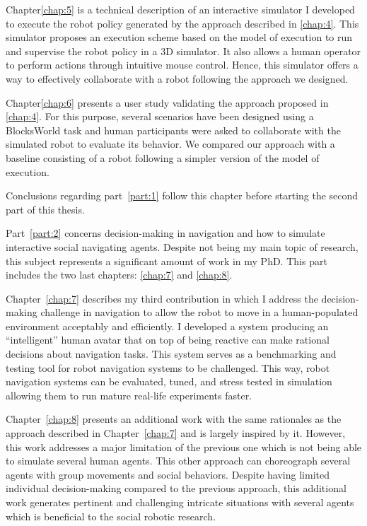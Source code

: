 Chapter\ref{chap:5} is a technical description of an interactive simulator I developed to execute the robot policy generated by the approach described in \ref{chap:4}. This simulator proposes an execution scheme based on the model of execution to run and supervise the robot policy in a 3D simulator. It also allows a human operator to perform actions through intuitive mouse control. Hence, this simulator offers a way to effectively collaborate with a robot following the approach we designed.    

Chapter\ref{chap:6} presents a user study validating the approach proposed in \ref{chap:4}. For this purpose, several scenarios have been designed using a BlocksWorld task and human participants were asked to collaborate with the simulated robot to evaluate its behavior. We compared our approach with a baseline consisting of a robot following a simpler version of the model of execution. 

Conclusions regarding part~\ref{part:1} follow this chapter before starting the second part of this thesis. 

Part~\ref{part:2} concerns decision-making in navigation and how to simulate interactive social navigating agents. Despite not being my main topic of research, this subject represents a significant amount of work in my PhD. This part includes the two last chapters: \ref{chap:7} and \ref{chap:8}.

Chapter~\ref{chap:7} describes my third contribution in which I address the decision-making challenge in navigation to allow the robot to move in a human-populated environment acceptably and efficiently. I developed a system producing an ``intelligent'' human avatar that on top of being reactive can make rational decisions about navigation tasks. This system serves as a benchmarking and testing tool for robot navigation systems to be challenged. This way, robot navigation systems can be evaluated, tuned, and stress tested in simulation allowing them to run mature real-life experiments faster.  

Chapter~\ref{chap:8} presents an additional work with the same rationales as the approach described in Chapter~\ref{chap:7} and is largely inspired by it. However, this work addresses a major limitation of the previous one which is not being able to simulate several human agents. This other approach can choreograph several agents with group movements and social behaviors. Despite having limited individual decision-making compared to the previous approach, this additional work generates pertinent and challenging intricate situations with several agents which is beneficial to the social robotic research.

